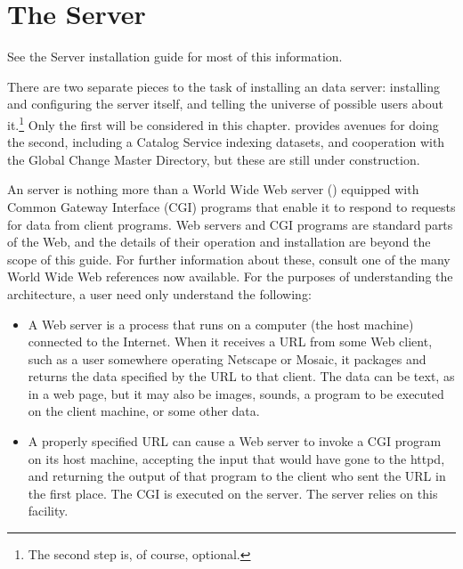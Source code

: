 %
%


\chapter{The \opendap Server}
\label{opd-server}

See the \opendap Server installation guide for most of this information.




There are two separate pieces to the task of installing an \opendap data
server: installing and configuring the server itself, and telling the
universe of possible users about it.\footnote{The second step is, of
  course, optional.} Only the first will be considered in this
chapter.  \opendap provides avenues for doing the second, including a
Catalog Service indexing \opendap datasets, and cooperation with the
Global Change Master Directory, but these are still under
construction.

An \opendap server is nothing more than a World Wide Web server
() equipped with Common Gateway Interface (CGI) programs
that enable it to respond to requests for data from \opendap client
programs.  Web servers and CGI programs are standard parts of the Web,
and the details of their operation and installation are beyond the
scope of this guide. For further information about these, consult one
of the many World Wide Web references now available. For the purposes
of understanding the \opendap architecture, a user need only understand
the following:

\begin{itemize}

\item A Web server is a process that runs on a computer (the host
machine) connected to the Internet. When it receives a URL from some
Web client, such as a user somewhere operating Netscape or Mosaic, it
packages and returns the data specified by the URL to that client. The
data can be text, as in a web page, but it may also be images, sounds,
a program to be executed on the client machine, or some other data.

\item A properly specified URL can cause a Web server to invoke a 
CGI program on its host machine, accepting the input that would have
gone to the httpd, and  returning the output of that program
to the client who sent the URL in the first place. The CGI is executed
on the server. The \opendap server relies on this facility. 

\end{itemize}

